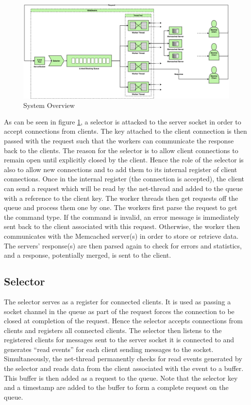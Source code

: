 \documentclass[11pt,a4paper]{article}
\begin{document}
\begin{figure}[h]
    \centering
    \includegraphics[width=\textwidth]{processing/graphics/system_overview.png}
    \caption{System Overview}
    \label{png::system_overview}
\end{figure}

As can be seen in figure \ref{png::system_overview}, a selector is attacked to the server socket in order to accept connections from clients. The key attached to the client connection is then passed with the request such that the workers can communicate the response back to the clients. The reason for the selector is to allow client connections to remain open until explicitly closed by the client. Hence the role of the selector is also to allow new connections and to add them to its internal register of client connections. Once in the internal register (the connection is accepted), the client can send a request which will be read by the net-thread and added to the queue with a reference to the client key. The worker threads then get requests off the queue and process them one by one. The workers first parse the request to get the command type. If the command is invalid, an error message is immediately sent back to the client associated with this request. Otherwise, the worker then communicates with the Memcached server(s) in order to store or retrieve data. The servers' response(s) are then parsed again to check for errors and statistics, and a response, potentially merged, is sent to the client.

\subsection{Selector}
The selector serves as a register for connected clients. It is used as passing a socket channel in the queue as part of the request forces the connection to be closed at completion of the request. Hence the selector accepts connections from clients and registers all connected clients. The selector then listens to the registered clients for messages sent to the server socket it is connected to and generates ``read events'' for each client sending messages to the socket. Simultaneously, the net-thread permanently checks for read events generated by the selector and reads data from the client associated with the event to a buffer. This buffer is then added as a request to the queue. Note that the selector key and a timestamp are added to the buffer to form a complete request on the queue.
\end{document}
